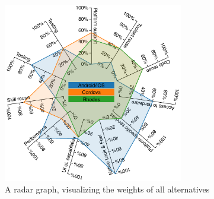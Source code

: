 \begin{figure}
    \centering
    \includegraphics[width=0.7\textwidth]{../resources/figs/priority_radar.pdf}
    \caption{A radar graph, visualizing the weights of all alternatives}
    \label{fig:radar}
\end{figure}

